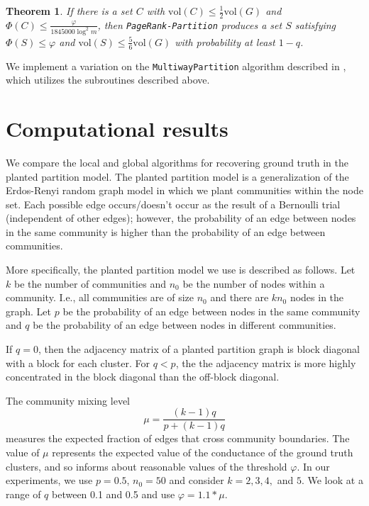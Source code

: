 \documentclass[11pt]{article}
\newtheorem{theorem}{Theorem}[section]
\begin{document}
\begin{theorem}\label{thm:partition}
If there is a set $C$ with $\text{vol}(C) \leq \frac{1}{2} \text{vol}(G)$ and $\Phi(C) \leq \frac{\varphi}{1845000 \log^2 m}$, then {\tt PageRank-Partition} produces a set $S$ satisfying $\Phi(S) \leq \varphi$ and $\text{vol}(S) \leq \frac{5}{6} \text{vol}(G)$ with probability at least $1-q$.
\end{theorem}

We implement a variation on the {\tt MultiwayPartition} algorithm described in \cite{spielman}, which utilizes the subroutines described above.





\section{Computational results}
\label{Computational results}

We compare the local and global algorithms for recovering ground truth in the planted partition model. The planted partition model is a generalization of the Erdos-Renyi random graph model in which we plant communities within the node set. Each possible edge occurs/doesn't occur as the result of a Bernoulli trial (independent of other edges); however, the probability of an edge between nodes in the same community is higher than the probability of an edge between communities.

More specifically, the planted partition model we use is described as follows. Let $k$ be the number of communities and $n_0$ be the number of nodes within a community. I.e., all communities are of size $n_0$ and there are $kn_0$ nodes in the graph. Let $p$ be the probability of an edge between nodes in the same community and $q$ be the probability of an edge between nodes in different communities.

If $q=0$, then the adjacency matrix of a planted partition graph is block diagonal with a block for each cluster. For $q < p$, the the adjacency matrix is more highly concentrated in the block diagonal than the off-block diagonal. 

The community mixing level
$$\mu = \frac{(k-1)q}{p+(k-1)q}$$
measures the expected fraction of edges that cross community boundaries. The value of $\mu$ represents the expected value of the conductance of the ground truth clusters, and so informs about reasonable values of the threshold $\varphi$. In our experiments, we use $p=0.5$, $n_0 = 50$ and consider $k=2,3,4,$ and $5$. We look at a range of $q$ between 0.1 and 0.5 and use $\varphi = 1.1*\mu$.
\end{document}
